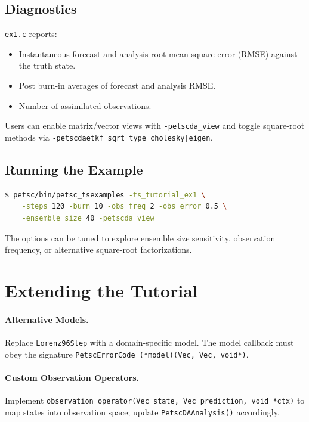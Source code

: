 \documentclass[11pt]{article}
\begin{document}
\subsection{Diagnostics}

\texttt{ex1.c} reports:

\begin{itemize}[nosep]
  \item Instantaneous forecast and analysis root-mean-square error (RMSE) against the truth state.
  \item Post burn-in averages of forecast and analysis RMSE.
  \item Number of assimilated observations.
\end{itemize}

Users can enable matrix/vector views with \texttt{-petscda\_view} and toggle square-root methods via \texttt{-petscdaetkf\_sqrt\_type cholesky|eigen}.

\subsection{Running the Example}

\begin{lstlisting}[language=bash]
$ petsc/bin/petsc_tsexamples -ts_tutorial_ex1 \
    -steps 120 -burn 10 -obs_freq 2 -obs_error 0.5 \
    -ensemble_size 40 -petscda_view
\end{lstlisting}

The options can be tuned to explore ensemble size sensitivity, observation frequency, or alternative square-root factorizations.

\section{Extending the Tutorial}

\paragraph{Alternative Models.} Replace \texttt{Lorenz96Step} with a domain-specific model. The model callback must obey the signature \texttt{PetscErrorCode (*model)(Vec, Vec, void*)}.

\paragraph{Custom Observation Operators.} Implement \texttt{observation\_operator(Vec state, Vec prediction, void *ctx)} to map states into observation space; update \texttt{PetscDAAnalysis()} accordingly.
\end{document}
